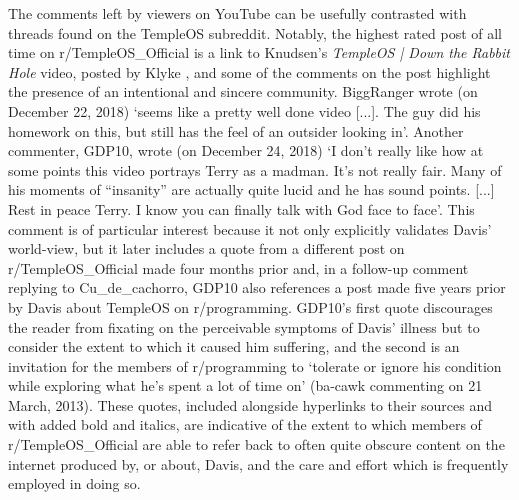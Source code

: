 \documentclass[Draft.tex]{subfiles}
\begin{document}
The comments left by viewers on YouTube can be usefully contrasted
with threads found on the TempleOS subreddit\footnotemark.
Notably, the highest rated post of all time on r/TempleOS\_Official
is a link to Knudsen's \textit{TempleOS | Down the Rabbit Hole} video,
posted by Klyke \parencite*{Klyke18},
and some of the comments on the post highlight the presence of
an intentional and sincere community.
BiggRanger wrote (on December 22, 2018)
`seems like a pretty well done video [...].  The guy did his homework on this,
but still has the feel of an outsider looking in'.
Another commenter, GDP10, wrote (on December 24, 2018)
`I don't really like how at some points this video portrays Terry as a madman.
It's not really fair.  Many of his moments of ``insanity''
are actually quite lucid and he has sound points. [...]
Rest in peace Terry.  I know you can finally talk with God face to face'.
This comment is of particular interest because it not only explicitly validates
Davis' world-view, but it later includes a quote from a different post on
r/TempleOS\_Official made four months prior and,
in a follow-up comment replying to Cu\_de\_cachorro, GDP10 also references
a post made five years prior by Davis \parencite*{Davis13}
about TempleOS on r/programming.
GDP10's first quote discourages the reader from fixating on the perceivable
symptoms of Davis' illness but to consider the extent to which it caused him
suffering, and the second is an invitation for the members of r/programming
to `tolerate or ignore his condition
while exploring what he's spent a lot of time on'
(ba-cawk commenting on 21 March, 2013).
These quotes, included alongside hyperlinks to their sources and with added bold and italics,
are indicative of the extent to which members of r/TempleOS\_Official
are able to refer back to often quite obscure content on the internet produced
by, or about, Davis, and the care and effort which is frequently employed
in doing so.
\end{document}
